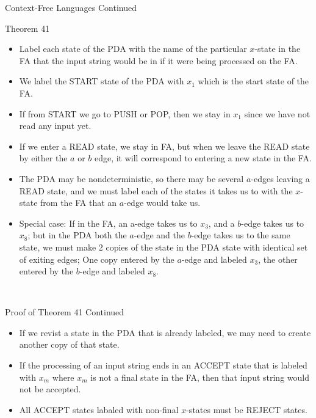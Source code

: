 \documentclass{article}
\begin{document}
\begin{multicols*}{3}
\begin{blackbox}{Context-Free Languages Continued}
\begin{brownbox}{Theorem 41}
        \begin{itemize}[leftmargin=7pt]
            \item Label each state of the PDA with the name of the particular $x$-state in the FA that the input string would be in if it were being processed on the FA.
            \item We label the START state of the PDA with $x_1$ which is the start state of the FA.
            \item If from START we go to PUSH or POP, then we stay in $x_1$ since we have not read any input yet.
            \item If we enter a READ state, we stay in FA, but when we leave the READ state by either the $a$ or $b$ edge, it will correspond to entering a new state in the FA.
            \item The PDA may be nondeterministic, so there may be several $a$-edges leaving a READ state, and we must label each of the states it takes us to with the $x$-state from the FA that an $a$-edge would take us.
            \item Special case: If in the FA, an a-edge takes us to $x_3$, and a $b$-edge takes us to $x_8$; but in the PDA both the $a$-edge and the $b$-edge takes us to the same state, we must make 2 copies of the state in the PDA state with identical set of exiting edges;  One copy entered by the $a$-edge and labeled $x_3$, the other entered by the $b$-edge and labeled $x_8$.
        \end{itemize}
    \end{brownbox}\\[-2ex]
\end{blackbox}
\begin{blackbox}{Proof of Theorem 41 Continued}
    \begin{itemize}[leftmargin=7pt]
        \item If we revist a state in the PDA that is already labeled, we may need to create another copy of that state.
        \item If the processing of an input string ends in an ACCEPT state that is labeled with $x_m$ where $x_m$ is not a final state in the FA, then that input string would not be accepted.
        \item All ACCEPT states labaled with non-final $x$-states must be REJECT states.
    \end{itemize}
\end{blackbox}



\end{multicols*}
\end{document}

